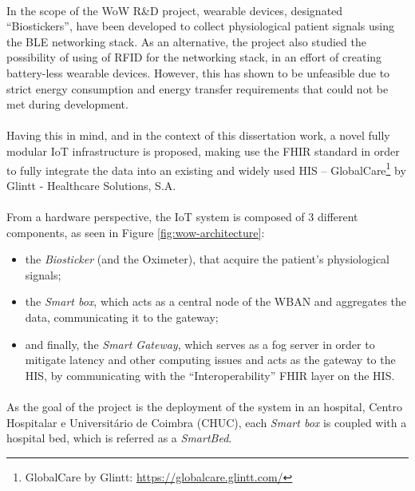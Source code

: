 \paragraph{} In the scope of the \acs{WoW} R\&D project, wearable devices, designated ``Biostickers'', have been developed to collect physiological patient signals using the \acs{BLE} networking stack. As an alternative, the project also studied the possibility of using of \acs{RFID} for the networking stack, in an effort of creating battery-less wearable devices. However, this has shown to be unfeasible due to strict energy consumption and energy transfer requirements that could not be met during development. 

\paragraph{} Having this in mind, and in the context of this dissertation work, a novel fully modular \acs{IoT} infrastructure is proposed, making use the \acs{FHIR} standard in order to fully integrate the data into an existing and widely used \acs{HIS} -- GlobalCare\footnote{GlobalCare by Glintt: \url{https://globalcare.glintt.com/}} by Glintt - Healthcare Solutions, S.A. 

\paragraph{} From a hardware perspective, the \acs{IoT} system is composed of 3 different components, as seen in Figure \ref{fig:wow-architecture}:
\begin{itemize}
    \item the \textit{Biosticker} (and the Oximeter), that acquire the patient's physiological signals;
    \item the \textit{Smart box}, which acts as a central node of the \acs{WBAN} and aggregates the data, communicating it to the gateway;
    \item and finally, the \textit{Smart Gateway}, which serves as a fog server in order to mitigate latency and other computing issues and acts as the gateway to the \acs{HIS}, by communicating with the ``Interoperability'' \acs{FHIR} layer on the \acs{HIS}.
\end{itemize}

\paragraph{} As the goal of the project is the deployment of the system in an hospital, Centro Hospitalar e Universitário de Coimbra (CHUC), each \textit{Smart box} is coupled with a hospital bed, which is referred as a \textit{SmartBed}.

